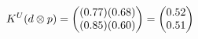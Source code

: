 \documentclass[preview]{standalone}
\begin{document}
\begin{align*}
\special{dvisvgm:raw <g id='unique000'>}K^U(d \otimes p) = \begin{pmatrix} (0.77)(0.68) \\ (0.85)(0.60) \end{pmatrix} = \begin{pmatrix} 0.52 \\ 0.51 \end{pmatrix}\special{dvisvgm:raw </g>}
\end{align*}
\end{document}
